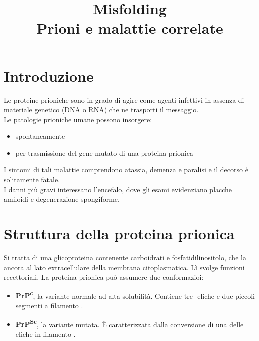 \documentclass[a4paper, 12pt]{article}
\date{}
\title{%
  Misfolding \\
  \large Prioni e malattie correlate
}
\begin{document}
\maketitle

\section{Introduzione}
Le proteine prioniche sono in grado di agire come agenti infettivi in assenza di materiale genetico (DNA o RNA) che ne trasporti il messaggio.\\
Le patologie prioniche umane possono insorgere:
\begin{itemize}
\item spontaneamente
\item per trasmissione del gene mutato di una proteina prionica
\end{itemize}
I sintomi di tali malattie comprendono atassia, demenza e paralisi e il decorso è solitamente fatale.\\
I danni più gravi interessano l'encefalo, dove gli esami evidenziano placche amiloidi e degenerazione spongiforme.

\section{Struttura della proteina prionica}
Si tratta di una glicoproteina contenente carboidrati e fosfatidilinositolo, che la ancora al lato extracellulare della membrana citoplasmatica. Lì svolge funzioni recettoriali.
La proteina prionica può assumere due conformazioi:
\begin{itemize}
\item \textbf{PrP\textsuperscript{c}}, la variante normale ad alta solubilità. Contiene tre \textalpha-eliche e due piccoli segmenti a filamento \textbeta.
\item \textbf{PrP\textsuperscript{Sc}}, la variante mutata. È caratterizzata dalla conversione di una delle eliche in filamento \textbeta.
\end{itemize}
\end{document}
